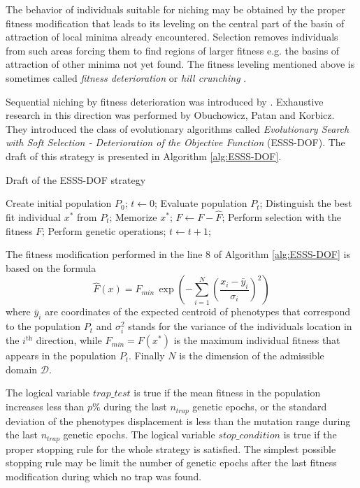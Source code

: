 The behavior of individuals suitable for niching
may be obtained by the proper
fitness modification that leads to its leveling 
on the central part of the basin of attraction of local minima already encountered.
Selection removes individuals from such areas forcing them to find regions of
larger fitness e.g. the basins of attraction of other minima not yet found.
The fitness leveling mentioned above is sometimes called
\textit{fitness deterioration} \cite{Obuchowicz1997} 
or \textit{hill crunching} \cite{SchaeferAdamskaTelega2004}.

Sequential niching by fitness deterioration was introduced by 
\cite{BeasleyBullMartin1993}.
Exhaustive research in this direction was performed by
Obuchowicz, Patan and Korbicz. They introduced the class
of evolutionary algorithms called \textit{Evolutionary Search 
with Soft Selection - Deterioration of the Objective Function}
(ESSS-DOF). 
The draft of this strategy
is presented in Algorithm \ref{alg:ESSS-DOF}.
\begin{algorithm}
\caption{Draft of the ESSS-DOF strategy}
\label{alg:ESSS-DOF}
\begin{algorithmic}[1]
\STATE Create initial population $P_0$;
\STATE $t \leftarrow 0$; 
\REPEAT
\STATE Evaluate population $P_t$;
\STATE Distinguish the best fit individual $x^*$ from $P_t$;
\STATE Memorize $x^*$;
\STATE $F \leftarrow F - \hat{F}$;
\ENDIF
\STATE Perform selection with the fitness $F$;
\STATE Perform genetic operations;
\STATE $t \leftarrow t+1$;
\end{algorithmic}
\end{algorithm}
The fitness modification performed in the line 8 of Algorithm \ref{alg:ESSS-DOF}
is based on the formula
\begin{equation}
\label{FitnessDeterioration_1}
\hat{F}(x) = F_{min} \, \exp \left( - \sum_{i = 1}^N 
\left( \frac{x_i - \bar{y}_i}{\sigma_i} \right)^2 \right)
\end{equation}
where $\bar{y}_i$ are coordinates of the expected centroid of phenotypes that 
correspond to the population $P_t$ and $\sigma_i^2$
stands for the variance of the individuals location in the $i^{\text{th}}$ 
direction, while $F_{min} = F(x^*)$ is the maximum individual fitness that appears 
in the population $P_t$. Finally $N$ is the dimension of the admissible domain
$\mathcal{D}$.

The logical variable $trap\_test$ is true if
the mean fitness in the population increases less than $p\%$ during the last $n_{trap}$
genetic epochs, or the standard deviation of the 
phenotypes displacement is less than the mutation range during the last $n_{trap}$
genetic epochs.
The logical variable $stop\_condition$ is true if the proper stopping rule for the whole strategy is satisfied. The simplest possible stopping rule may be limit the number of genetic epochs after the last fitness modification during which no trap was found.

